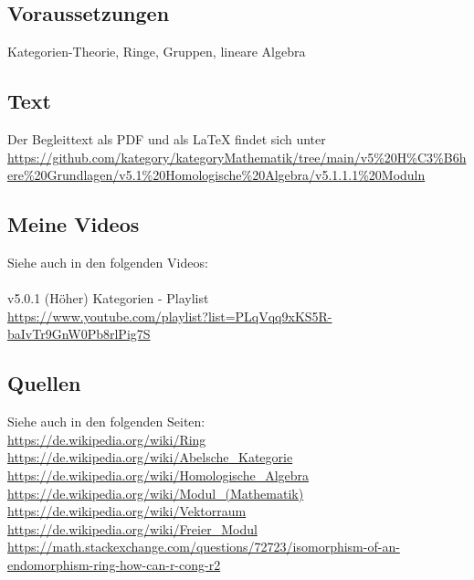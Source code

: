 \documentclass[a4paper]{amsart}
\theoremstyle{definition}
\begin{document}
\subsection*{Voraussetzungen}
Kategorien-Theorie, Ringe, Gruppen, lineare Algebra

\subsection*{Text}
Der Begleittext als PDF und als LaTeX findet sich unter
{\tiny
   \url{https://github.com/kategory/kategoryMathematik/tree/main/v5%20H%C3%B6here%20Grundlagen/v5.1%20Homologische%20Algebra/v5.1.1.1%20Moduln}
}

\subsection*{Meine Videos}
Siehe auch in den folgenden Videos:\\
\\
v5.0.1 (Höher) Kategorien - Playlist\\
\url{https://www.youtube.com/playlist?list=PLqVqq9xKS5R-baIvTr9GnW0Pb8rlPig7S}

\subsection*{Quellen}
Siehe auch in den folgenden Seiten:\\
\url{https://de.wikipedia.org/wiki/Ring}\\
\url{https://de.wikipedia.org/wiki/Abelsche_Kategorie}\\
\url{https://de.wikipedia.org/wiki/Homologische_Algebra}\\
\url{https://de.wikipedia.org/wiki/Modul_(Mathematik)}\\
\url{https://de.wikipedia.org/wiki/Vektorraum}\\
\url{https://de.wikipedia.org/wiki/Freier_Modul}\\
\url{https://math.stackexchange.com/questions/72723/isomorphism-of-an-endomorphism-ring-how-can-r-cong-r2}
\end{document}
